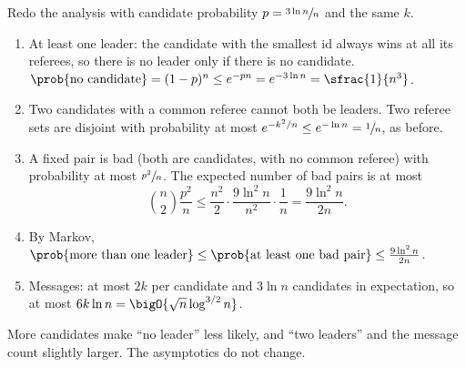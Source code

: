 
\begin{exercisebox}
\begin{pproblem}[$p = 3 \ln n / n$]\label{pp:leader3}
    Redo the analysis with candidate probability $p = \sfrac{3 \ln n}{n}$ and the same $k$.
\end{pproblem}
\tcblower
\begin{wsolution}
    \leavevmode
    \begin{enumerate}
        \item At least one leader: the candidate with the smallest id always wins at all its
              referees, so there is no leader only if there is no candidate.
              $\prob{\text{no candidate}} = (1-p)^n \leq e^{-pn} = e^{-3 \ln n} = \sfrac{1}{n^3}$.
        \item Two candidates with a common referee cannot both be leaders. Two referee sets are
              disjoint with probability at most $e^{-k^2/n} \leq e^{-\ln n} = \sfrac{1}{n}$, as
              before.
        \item A fixed pair is bad (both are candidates, with no common referee) with probability at
              most $\sfrac{p^2}{n}$. The expected number of bad pairs is at most
              \[\binom{n}{2} \frac{p^2}{n} \leq \frac{n^2}{2} \cdot \frac{9 \ln^2 n}{n^2} \cdot \frac{1}{n} = \frac{9 \ln^2 n}{2n}.\]
        \item By Markov,
              $\prob{\text{more than one leader}} \leq \prob{\text{at least one bad pair}} \leq \frac{9 \ln^2 n}{2n}$.
        \item Messages: at most $2k$ per candidate and $3 \ln n$ candidates in expectation, so at
              most $6k \ln n = \bigO{\sqrt{n} \log^{3/2} n}$.
    \end{enumerate}
    More candidates make ``no leader'' less likely, and ``two leaders'' and the message count
    slightly larger. The asymptotics do not change.
\end{wsolution}
\end{exercisebox}

